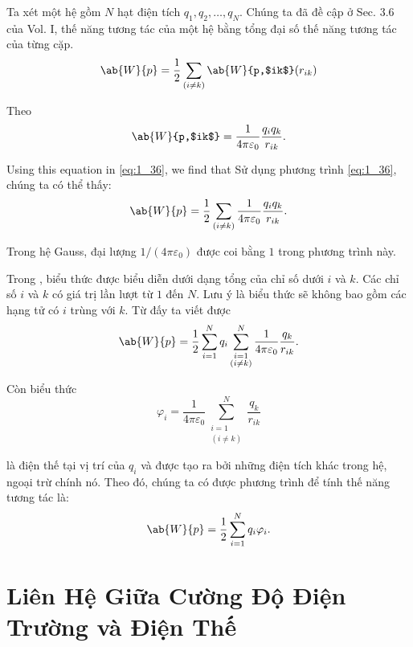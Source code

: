 Ta xét một hệ gồm $N$ hạt điện tích $q_1, q_2, \ldots, q_N$. Chúng ta đã đề cập ở Sec. 3.6 của Vol. I, thế năng tương tác của một hệ bằng tổng đại số thế năng tương tác của từng cặp.
\begin{equation}\label{eq:1_36}
	\ab{W}{p} = \frac{1}{2} \sum_{(i\neq k)} \ab{W}{p,$ik$}(r_{ik})
\end{equation}


Theo 
\begin{equation*}
	\ab{W}{p,$ik$} = \frac{1}{4\pi\varepsilon_0} \frac{q_i q_k}{r_{ik}}.
\end{equation*}

\noindent
Using this equation in \eqref{eq:1_36}, we find that Sử dụng phương trình \eqref{eq:1_36}, chúng ta có thể thấy:
\begin{equation}\label{eq:1_37}
	\ab{W}{p} = \frac{1}{2} \sum_{(i\neq k)} \frac{1}{4\pi\varepsilon_0} \frac{q_i q_k}{r_{ik}}.
\end{equation}

Trong hệ Gauss, đại lượng $1/(4\pi\varepsilon_0)$ được coi bằng $1$ trong phương trình này.

Trong , biểu thức được biểu diễn dưới dạng tổng của chỉ số dưới $i$ và $k$. Các chỉ số $i$ và $k$ có giá trị lần lượt từ $1$ đến $N$. Lưu ý là biểu thức sẽ không bao gồm các hạng tử có $i$ trùng với $k$. Từ đấy ta viết được 
\begin{equation}\label{eq:1_38}
	\ab{W}{p} = \frac{1}{2} \sum_{i=1}^N q_i \sum_{\substack{{i=1}\\ (i\neq k)}}^N \frac{1}{4\pi\varepsilon_0} \frac{q_k}{r_{ik}}.
\end{equation}

\noindent
Còn biểu thức
\begin{equation*}
	\varphi_i =  \frac{1}{4\pi\varepsilon_0} \sum_{\substack{{i=1}\\ (i\neq k)}}^N \frac{q_k}{r_{ik}}
\end{equation*}

\noindent
là điện thế tại vị trí của $q_i$ và được tạo ra bởi những điện tích khác trong hệ, ngoại trừ chính nó. Theo đó, chúng ta có được phương trình để tính thế năng tương tác là:
\begin{equation}\label{eq:1_39}
	\ab{W}{p} = \frac{1}{2} \sum_{i=1}^N q_i \varphi_i.
\end{equation}

\section{Liên Hệ Giữa Cường Độ Điện Trường và Điện Thế}\label{sec:1_8}

